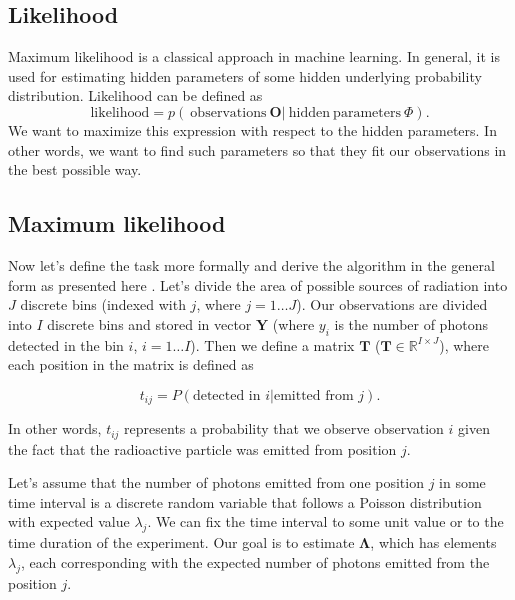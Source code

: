 \subsection{Likelihood}
Maximum likelihood is a classical approach in machine learning.
In general, it is used for estimating hidden parameters of some hidden underlying probability distribution.
Likelihood can be defined as 
\begin{equation}
  \mathrm{likelihood} = p(\ \mathrm{observations } \  \boldsymbol{O} | \ \mathrm{hidden \ parameters\ } \Phi ).
  \label{eq:likelihood}
\end{equation}
We want to maximize this expression with respect to the hidden parameters.
In other words, we want to find such parameters so that they fit our observations in the best possible way.

\subsection{Maximum likelihood}
Now let's define the task more formally and derive the algorithm in the general form as presented here \cite{}.
Let's divide the area of possible sources of radiation into $J$ discrete bins (indexed with $j$, where $j = 1 \dotsc J$).
Our observations are divided into $I$ discrete bins and stored in vector $\mathbf{Y}$ (where $y_{i}$ is the number of photons detected in the bin $i$, $i = 1 \dotsc I$).
Then we define a matrix $\mathbf{T}$ ($\mathbf{T} \in \mathbb{R}^{I \times J}$), where each position in the matrix is defined as

\begin{equation}
  t_{ij} =  P(\textrm{detected in } i | \textrm{emitted from } j).
\end{equation}

In other words, $t_{ij}$ represents a probability that we observe observation $i$ given the fact that the radioactive particle was emitted from position $j$.

Let's assume that the number of photons emitted from one position $j$ in some time interval is a discrete random variable that follows a Poisson distribution with expected value $\lambda_{j}$.
We can fix the time interval to some unit value or to the time duration of the experiment.
Our goal is to estimate $\mathbf{\Lambda}$, which has elements $\lambda_{j}$, each corresponding with the expected number of photons emitted from the position $j$.

